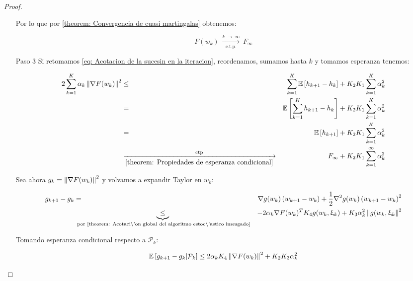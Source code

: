 \begin{proof}
\begin{enumerate}
		  Por lo que por \ref{theorem: Convergencia de cuasi martingalas} obtenemos:
		 
		 \begin{equation}
		 F(w_k) \ \xrightarrow[\text{c.t.p.}]{k \ \rightarrow \ \infty } \ F_{\infty}
		 \end{equation}
		 
		 \item[Paso 3] Si retomamos \ref{eq: Acotacion de la sucesin en la iteracion}, reordenamos, sumamos hasta $k$ y tomamos esperanza tenemos: 
		 
		 \begin{equation}
		 \label{eq: los gradientes ponderados son sumables en caso no convexo ctp}
		 	\begin{aligned}
		 	2\sum\limits_{k=1}^{K} {\alpha_k \left\lVert\nabla F(w_k)\right\rVert^2} & \leq & \sum\limits_{k=1}^{K} {\mathbb{E} \left[h_{k+1} - h_k\right]} + K_2K_1 \sum\limits_{k=1}^{K} {\alpha_k^2} \\
		 	& = & \mathbb{E} \left[\sum\limits_{k=1}^{K} {h_{k+1} - h_k}\right] + K_2K_1 \sum\limits_{k=1}^{K} {\alpha_k^2} \\
		 	& = & \mathbb{E} \left[h_{k+1}\right] + K_2K_1 \sum\limits_{k=1}^{K} {\alpha_k^2} \\
		 	& \xrightarrow[\ref{theorem: Propiedades de esperanza condicional}]{\text{ ctp }} & F_{\infty} + K_2K_1 \sum\limits_{k=1}^{\infty} {\alpha_k^2}
		 	\end{aligned}
		 \end{equation}
		 
		 Sea ahora $g_k = \left\lVert\nabla F (w_k)\right\rVert^2$ y volvamos a expandir Taylor en $w_k$:
		 
		 \begin{equation*}
		 \begin{aligned}
		 g_{k+1} - g_k & = & \nabla g(w_k) \left(w_{k+1} - w_k\right) + \frac{1}{2} \nabla^2 g(w_k) \left(w_{k+1} - w_k\right)^2 \\
		 &\underbrace{\leq}_{\text{ por \ref{theorem: Acotaci\'on global del algoritmo estoc\'astico insesgado}}} & - 2 \alpha_k \nabla F(w_k)^T K_4 g(w_k, \upxi_{k}) + K_3 \alpha_k^2 \left\lVert g(w_k, \upxi_{k}\right\rVert^2 \\
		 \end{aligned}
		 \end{equation*}
		 
		 Tomando esperanza condicional respecto a $\mathcal{P}_k$:
		 
		 \begin{equation}
		 	\mathbb{E} \left[{g_{k+1} - g_k } \vert \mathcal{P}_{k}\right] \leq 2 \alpha_k K_4 \left\lVert\nabla F(w_k)\right\rVert^2 + K_2K_3\alpha_k^2
		 \end{equation}
		 

\end{enumerate}
\end{proof}
